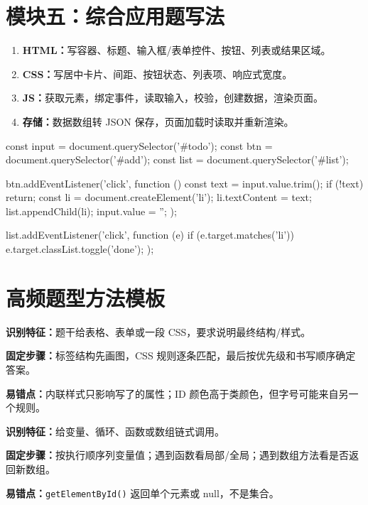 \documentclass[UTF8,zihao=-4]{ctexart}
\begin{document}
\section{模块五：综合应用题写法}

\begin{methodbox}[综合题四步模板]
\begin{enumerate}
  \item \textbf{HTML：}写容器、标题、输入框/表单控件、按钮、列表或结果区域。
  \item \textbf{CSS：}写居中卡片、间距、按钮状态、列表项、响应式宽度。
  \item \textbf{JS：}获取元素，绑定事件，读取输入，校验，创建数据，渲染页面。
  \item \textbf{存储：}数据数组转 JSON 保存，页面加载时读取并重新渲染。
\end{enumerate}
\end{methodbox}

\begin{examplebox}[待办事项核心代码]
\begin{Code}
const input = document.querySelector('#todo');
const btn = document.querySelector('#add');
const list = document.querySelector('#list');

btn.addEventListener('click', function () {
  const text = input.value.trim();
  if (!text) return;
  const li = document.createElement('li');
  li.textContent = text;
  list.appendChild(li);
  input.value = '';
});

list.addEventListener('click', function (e) {
  if (e.target.matches('li')) {
    e.target.classList.toggle('done');
  }
});
\end{Code}
\end{examplebox}

\section{高频题型方法模板}

\begin{methodbox}
\textbf{识别特征：}题干给表格、表单或一段 CSS，要求说明最终结构/样式。\par
\textbf{固定步骤：}标签结构先画图，CSS 规则逐条匹配，最后按优先级和书写顺序确定答案。\par
\textbf{易错点：}内联样式只影响写了的属性；ID 颜色高于类颜色，但字号可能来自另一个规则。
\end{methodbox}

\begin{methodbox}
\textbf{识别特征：}给变量、循环、函数或数组链式调用。\par
\textbf{固定步骤：}按执行顺序列变量值；遇到函数看局部/全局；遇到数组方法看是否返回新数组。\par
\textbf{易错点：}\texttt{getElementById()} 返回单个元素或 null，不是集合。
\end{methodbox}
\end{document}
